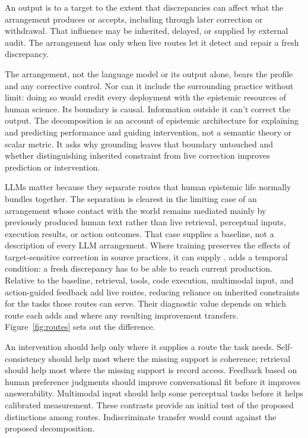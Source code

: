 \documentclass[12pt]{article}
\begin{document}
An output is  to a target to the extent that discrepancies can affect what
the arrangement produces or accepts, including through later correction or withdrawal.
That influence may be inherited, delayed, or supplied by external audit. The arrangement
has  only when live routes let it detect and repair a fresh
discrepancy.

The arrangement, not the language model or its output alone, bears the profile and any
corrective control. Nor can it include the surrounding practice without limit: doing so
would credit every deployment with the epistemic resources of human science. Its boundary
is causal. Information outside it can't correct the output. The decomposition is an account
of epistemic architecture for explaining and predicting performance and guiding
intervention, not a semantic theory or scalar metric. It asks why grounding leaves that
boundary untouched and whether distinguishing inherited constraint from live correction
improves prediction or intervention.

LLMs matter because they separate routes that human epistemic life normally bundles
together. The separation is clearest in the limiting case of an arrangement whose contact with
the world remains mediated mainly by previously produced human text rather than live
retrieval, perceptual inputs, execution results, or action outcomes. That case supplies a
baseline, not a description of every LLM arrangement. Where training preserves the effects
of target-sensitive correction in source practices, it can supply
.  adds a temporal condition: a
fresh discrepancy has to be able to reach current production. Relative to the baseline,
retrieval, tools, code execution, multimodal input, and action-guided feedback add live
routes, reducing reliance on inherited constraints for the tasks those routes can serve.
Their diagnostic value depends on which route each adds and where any resulting improvement
transfers.
Figure~\ref{fig:routes} sets out the difference.

An intervention should help only where it supplies a route the task needs. Self-consistency
should help most where the missing support is coherence; retrieval should help most where
the missing support is record access.
Feedback based on human preference judgments should improve conversational fit before it
improves answerability.
Multimodal input should help some perceptual tasks before it helps calibrated measurement.
These contrasts provide an initial test of the proposed distinctions among routes. Indiscriminate transfer would
count against the proposed decomposition.
\end{document}
